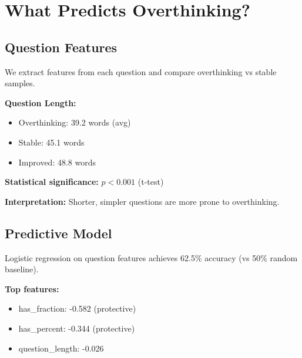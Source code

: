 \section{What Predicts Overthinking?}

\subsection{Question Features}

We extract features from each question and compare overthinking vs stable samples.

\textbf{Question Length:}
\begin{itemize}
\item Overthinking: 39.2 words (avg)
\item Stable: 45.1 words
\item Improved: 48.8 words
\end{itemize}

\textbf{Statistical significance:} $p < 0.001$ (t-test)

\textbf{Interpretation:} Shorter, simpler questions are more prone to overthinking.

\subsection{Predictive Model}

Logistic regression on question features achieves 62.5\% accuracy (vs 50\% random baseline).

\textbf{Top features:}
\begin{itemize}
\item has\_fraction: -0.582 (protective)
\item has\_percent: -0.344 (protective)
\item question\_length: -0.026
\end{itemize}
